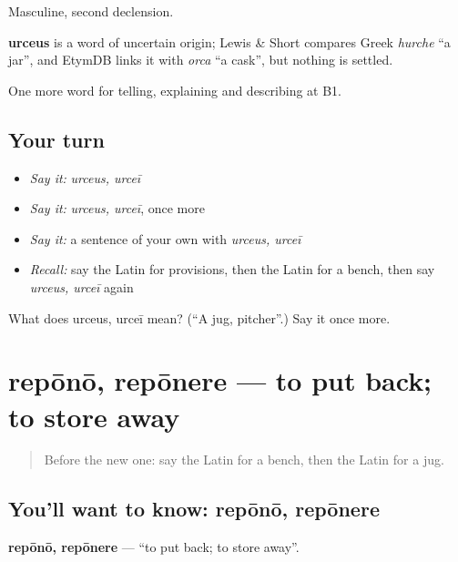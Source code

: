 Masculine, second declension.

\begin{cousinweb}
\textbf{urceus} is a word of uncertain origin; Lewis \& Short compares Greek \emph{hurche} \textquotedblleft{}a jar\textquotedblright{}, and EtymDB links it with \emph{orca} \textquotedblleft{}a cask\textquotedblright{}, but nothing is settled.
\end{cousinweb}

\begin{grammarlens}[title={What you've built}]
One more word for telling, explaining and describing at B1.
\end{grammarlens}

\subsection*{Your turn}
\begin{itemize}
\raggedright
  \item \emph{Say it:} \emph{urceus, urceī}
  \item \emph{Say it:} \emph{urceus, urceī}, once more
  \item \emph{Say it:} a sentence of your own with \emph{urceus, urceī}
  \item \emph{Recall:} say the Latin for provisions, then the Latin for a bench, then say \emph{urceus, urceī} again
\end{itemize}

\begin{tcolorbox}[breakable,colback=teal!4,colframe=teal!35!black,title={Before you move on}]
What does urceus, urceī mean? (\textquotedblleft{}A jug, pitcher\textquotedblright{}.) Say it once more.
\end{tcolorbox}
\section[repōnō, repōnere]{repōnō, repōnere — to put back; to store away}

\label{lesson:LA-C554-repono}



\begin{quote}
Before the new one: say the Latin for a bench, then the Latin for a jug.
\end{quote}

\subsection*{You'll want to know: repōnō, repōnere}
\textbf{repōnō, repōnere} — \textquotedblleft{}to put back; to store away\textquotedblright{}.

